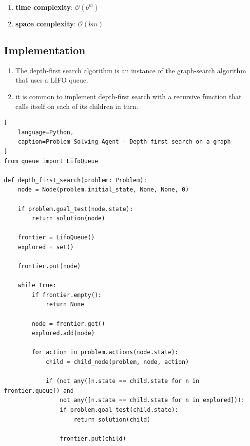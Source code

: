 \begin{enumerate}[itemsep=0.2cm]
\begin{enumerate}[itemsep=0.2cm]
\begin{enumerate}[itemsep=0.2cm]
            \item \textbf{time complexity}: $\mathcal{O}(b^m)$
            \hfill \cite{ai/book/Artificial-Intelligence-A-Modern-Approach/Russell-Norvig}

            \item \textbf{space complexity}: $\mathcal{O}(bm)$
            \hfill \cite{ai/book/Artificial-Intelligence-A-Modern-Approach/Russell-Norvig}
        \end{enumerate}
    \end{enumerate}
\end{enumerate}


\subsection*{Implementation}

\begin{enumerate}[itemsep=0.2cm]
    \item The depth-first search algorithm is an instance of the graph-search algorithm that uses a LIFO queue.
    \hfill \cite{ai/book/Artificial-Intelligence-A-Modern-Approach/Russell-Norvig}

    \item  it is common to implement depth-first search with a recursive function that calls itself  on each of its children in turn. 
    \hfill \cite{ai/book/Artificial-Intelligence-A-Modern-Approach/Russell-Norvig}
\end{enumerate}

\begin{lstlisting}[
    language=Python,
    caption=Problem Solving Agent - Depth first search on a graph
]
from queue import LifoQueue

def depth_first_search(problem: Problem):
    node = Node(problem.initial_state, None, None, 0)

    if problem.goal_test(node.state):
        return solution(node)
    
    frontier = LifoQueue()
    explored = set()

    frontier.put(node)

    while True:
        if frontier.empty():
            return None
        
        node = frontier.get()
        explored.add(node)

        for action in problem.actions(node.state):
            child = child_node(problem, node, action)

            if (not any([n.state == child.state for n in frontier.queue]) and 
                not any([n.state == child.state for n in explored])):
                if problem.goal_test(child.state):
                    return solution(child)

                frontier.put(child)
\end{lstlisting}














